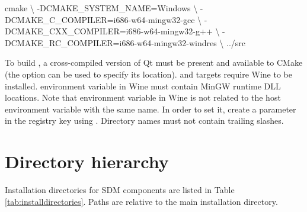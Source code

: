 \documentclass[a4paper,12pt,twoside,extrafontsizes]{memoir}
\begin{document}
\begin{shellcmds}
cmake \textbackslash
    -DCMAKE\_SYSTEM\_NAME=Windows \textbackslash
    -DCMAKE\_C\_COMPILER=i686-w64-mingw32-gcc \textbackslash
    -DCMAKE\_CXX\_COMPILER=i686-w64-mingw32-g++ \textbackslash
    -DCMAKE\_RC\_COMPILER=i686-w64-mingw32-windres \textbackslash
    ../src
\end{shellcmds}

To build , a cross-compiled version of Qt must be present and available to CMake (the  option can be used to specify its location).  and  targets require Wine to be installed.  environment variable in Wine must contain MinGW runtime DLL locations. Note that  environment variable in Wine is not related to the host environment variable with the same name. In order to set it, create a  parameter in the  registry key using . Directory names must not contain trailing slashes.

\section{Directory hierarchy}
\label{sec:installdirectories}

Installation directories for SDM components are listed in Table \ref{tab:installdirectories}. Paths are relative to the main installation directory.
\end{document}

